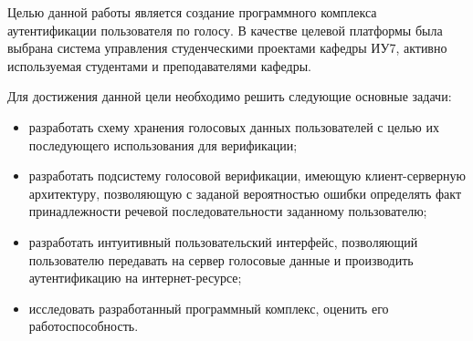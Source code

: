 \Intro


Целью данной работы является создание программного комплекса аутентификации пользователя по голосу.
В качестве целевой платформы была выбрана система управления студенческими проектами кафедры ИУ7, активно используемая студентами и преподавателями кафедры.


Для достижения данной цели необходимо решить следующие основные задачи:
\begin{itemize}
\item разработать схему хранения голосовых данных пользователей с целью их последующего использования для верификации;
\item разработать подсистему голосовой верификации, имеющую клиент-серверную архитектуру, позволяющую с заданой вероятностью ошибки определять факт принадлежности речевой последовательности заданному пользователю;
\item разработать интуитивный пользовательский интерфейс, позволяющий пользователю передавать на сервер голосовые данные и производить аутентификацию на интернет-ресурсе;
\item исследовать разработанный программный комплекс, оценить его работоспособность.
\end{itemize}

